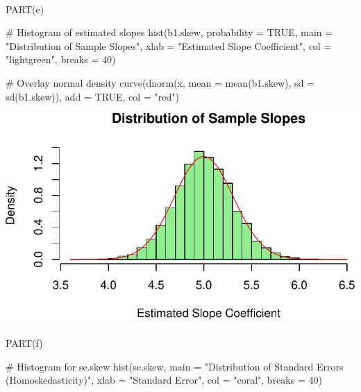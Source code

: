 \documentclass[
  11pt,
]{article}
\makeatletter
\let\oldparagraph\paragraph
\renewcommand{\paragraph}{
    \@ifstar
      \xxxParagraphStar
      \xxxParagraphNoStar
  }
\newcommand{\xxxParagraphStar}[1]{\oldparagraph*{#1}\mbox{}}
\newcommand{\xxxParagraphNoStar}[1]{\oldparagraph{#1}\mbox{}}
\newenvironment{Shaded}{\begin{snugshade}}{\end{snugshade}}
\newcommand{\AttributeTok}[1]{\textcolor[rgb]{0.40,0.45,0.13}{#1}}
\newcommand{\CommentTok}[1]{\textcolor[rgb]{0.37,0.37,0.37}{#1}}
\newcommand{\ConstantTok}[1]{\textcolor[rgb]{0.56,0.35,0.01}{#1}}
\newcommand{\DecValTok}[1]{\textcolor[rgb]{0.68,0.00,0.00}{#1}}
\newcommand{\FunctionTok}[1]{\textcolor[rgb]{0.28,0.35,0.67}{#1}}
\newcommand{\NormalTok}[1]{\textcolor[rgb]{0.00,0.23,0.31}{#1}}
\newcommand{\StringTok}[1]{\textcolor[rgb]{0.13,0.47,0.30}{#1}}
\makeatother
\begin{document}
\paragraph{PART(e)}\label{parte}

\begin{Shaded}
\begin{Highlighting}[]
\CommentTok{\# Histogram of estimated slopes}
\FunctionTok{hist}\NormalTok{(b1.skew, }\AttributeTok{probability =} \ConstantTok{TRUE}\NormalTok{, }\AttributeTok{main =} \StringTok{"Distribution of Sample Slopes"}\NormalTok{,}
     \AttributeTok{xlab =} \StringTok{"Estimated Slope Coefficient"}\NormalTok{, }\AttributeTok{col =} \StringTok{"lightgreen"}\NormalTok{, }\AttributeTok{breaks =} \DecValTok{40}\NormalTok{)}

\CommentTok{\# Overlay normal density}
\FunctionTok{curve}\NormalTok{(}\FunctionTok{dnorm}\NormalTok{(x, }\AttributeTok{mean =} \FunctionTok{mean}\NormalTok{(b1.skew), }\AttributeTok{sd =} \FunctionTok{sd}\NormalTok{(b1.skew)), }\AttributeTok{add =} \ConstantTok{TRUE}\NormalTok{, }\AttributeTok{col =} \StringTok{"red"}\NormalTok{)}
\end{Highlighting}
\end{Shaded}

\includegraphics{HW-4-CODE-and-ANSWERS_files/figure-pdf/unnamed-chunk-12-1.pdf}

\paragraph{PART(f)}\label{partf}

\begin{Shaded}
\begin{Highlighting}[]
\CommentTok{\# Histogram for se.skew}
\FunctionTok{hist}\NormalTok{(se.skew, }\AttributeTok{main =} \StringTok{"Distribution of Standard Errors (Homoskedasticity)"}\NormalTok{,}
     \AttributeTok{xlab =} \StringTok{"Standard Error"}\NormalTok{, }\AttributeTok{col =} \StringTok{"coral"}\NormalTok{, }\AttributeTok{breaks =} \DecValTok{40}\NormalTok{)}
\end{Highlighting}
\end{Shaded}
\end{document}
